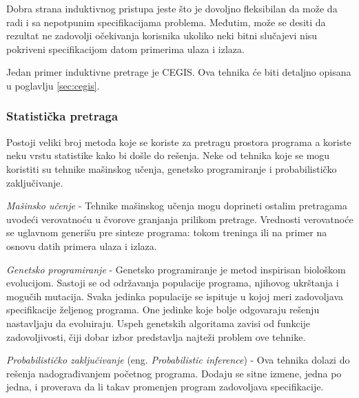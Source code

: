 Dobra strana induktivnog pristupa jeste što je dovoljno fleksibilan da može da radi i sa nepotpunim specifikacijama problema. Međutim, može se desiti da rezultat ne zadovolji očekivanja korisnika ukoliko neki bitni slučajevi nisu pokriveni specifikacijom datom primerima ulaza i izlaza.

Jedan primer induktivne pretrage je CEGIS. Ova tehnika će biti detaljno opisana u poglavlju \ref{sec:cegis}.


\subsubsection{Statistička pretraga}
\label{subsubsec:Statistical}

Postoji veliki broj metoda koje se koriste za pretragu prostora programa a koriste neku vrstu statistike kako bi došle do rešenja. Neke od tehnika koje se mogu koristiti su tehnike mašinskog učenja, genetsko programiranje i probabilističko zaključivanje.

\emph{Mašinsko učenje} - Tehnike mašinskog učenja mogu doprineti ostalim pretragama uvodeći verovatnoću u čvorove granjanja prilikom pretrage. Vrednosti verovatnoće se uglavnom generišu pre sinteze programa: tokom treninga ili na primer na osnovu datih primera ulaza i izlaza.

\emph{Genetsko programiranje} - Genetsko programiranje je metod inspirisan biološkom evolucijom. Sastoji se od održavanja populacije programa, njihovog ukrštanja i mogučih mutacija. Svaka jedinka populacije se ispituje u kojoj meri zadovoljava specifikacije željenog programa. One jedinke koje bolje odgovaraju rešenju nastavljaju da evoluiraju. Uspeh genetskih algoritama zavisi od funkcije zadovoljivosti, čiji dobar izbor predstavlja najteži problem ove tehnike.

\emph{Probabilističko zaključivanje} (eng. \emph{Probabilistic inference}) - Ova tehnika dolazi do rešenja nadograđivanjem početnog programa. Dodaju se sitne izmene, jedna po jedna, i proverava da li takav promenjen program zadovoljava specifikacije.
